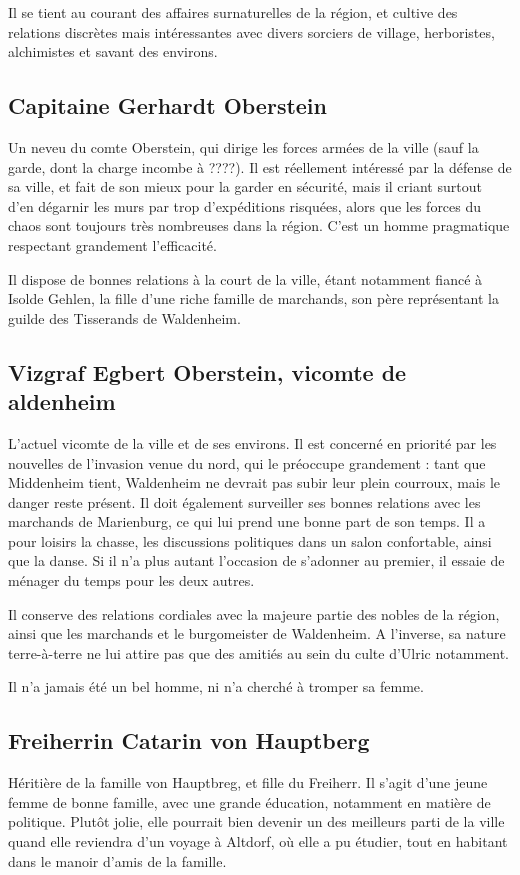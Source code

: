 \documentclass[10pt,a4paper]{book}
\begin{document}
Il se tient au courant des affaires surnaturelles de la région, et cultive des relations discrètes mais intéressantes avec divers sorciers de village, herboristes, alchimistes et savant des environs.
\subsection{Capitaine Gerhardt Oberstein}
Un neveu du comte Oberstein, qui dirige les forces armées de la ville (sauf la garde, dont la charge incombe à ????). Il est réellement intéressé par la défense de sa ville, et fait de son mieux pour la garder en sécurité, mais il criant surtout d'en dégarnir les murs par trop d'expéditions risquées, alors que les forces du chaos sont toujours très nombreuses dans la région. C'est un homme pragmatique respectant grandement l'efficacité.

Il dispose de bonnes relations à la court de la ville, étant notamment fiancé à Isolde Gehlen, la fille d'une riche famille de marchands, son père représentant la guilde des Tisserands de Waldenheim.

\subsection{Vizgraf Egbert Oberstein, vicomte de aldenheim}
L'actuel vicomte de la ville et de ses environs. Il est concerné en priorité par les nouvelles de l'invasion venue du nord, qui le préoccupe grandement : tant que Middenheim tient, Waldenheim ne devrait pas subir leur plein courroux, mais le danger reste présent. Il doit également surveiller ses bonnes relations avec les marchands de Marienburg, ce qui lui prend une bonne part de son temps. Il a pour loisirs la chasse, les discussions politiques dans un salon confortable, ainsi que la danse. Si il n'a plus autant l'occasion de s'adonner au premier, il essaie de ménager du temps pour les deux autres.

Il conserve des relations cordiales avec la majeure partie des nobles de la région, ainsi que les marchands et le burgomeister de Waldenheim. A l'inverse, sa nature terre-à-terre ne lui attire pas que des amitiés au sein du culte d'Ulric notamment.

Il n'a jamais été un bel homme, ni n'a cherché à tromper sa femme.

\subsection{Freiherrin Catarin von Hauptberg}
Héritière de la famille von Hauptbreg, et fille du Freiherr. Il s'agit d'une jeune femme de bonne famille, avec une grande éducation, notamment en matière de politique. Plutôt jolie, elle pourrait bien devenir un des meilleurs parti de la ville quand elle reviendra d'un voyage à Altdorf, où elle a pu étudier, tout en habitant dans le manoir d'amis de la famille.
\end{document}
